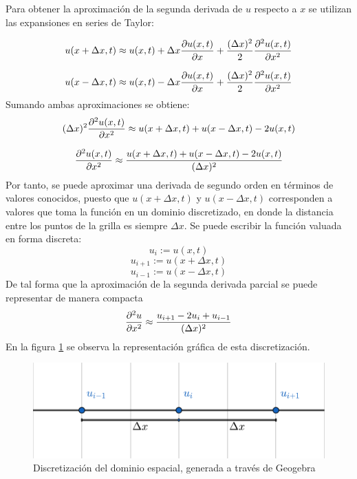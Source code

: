 \documentclass[12pt]{article}
\begin{document}
	Para obtener la aproximación de la segunda derivada de $u$ respecto a $x$ se utilizan las expansiones en series de Taylor:

	\begin{equation}
		u(x + \Delta x,t) \approx u(x,t) + \Delta x\pdv{u(x,t)}{x} + \frac{(\Delta x)^{2}}{2}\pdv{^{2}u(x,t)}{x^2} 
	\end{equation}

	\begin{equation}
		u(x - \Delta x,t) \approx u(x,t) - \Delta x\pdv{u(x,t)}{x}+\frac{(\Delta x)^{2}}{2}\pdv{^{2}u(x,t)}{x^2} 
	\end{equation}
	Sumando ambas aproximaciones se obtiene:
	\begin{equation}
		(\Delta x)^2 \pdv{^{2}u(x,t)}{x^2}\approx u(x + \Delta x,t) + u(x - \Delta x,t) - 2 u(x,t)
	\end{equation}

	\begin{equation}
		\pdv{^{2}u(x,t)}{x^2}\approx \frac{u(x + \Delta x,t) + u(x - \Delta x,t) - 2 u(x,t)}{(\Delta x)^2}
	\end{equation}
	Por tanto, se puede aproximar una derivada de segundo orden en términos de valores conocidos, puesto que $u(x + \Delta x,t)$ y $u(x - \Delta x,t)$ corresponden a valores que toma la función en un dominio discretizado, en donde la distancia entre los puntos de la grilla es siempre $\Delta x$. Se puede escribir la función valuada en forma discreta:
	\[u_{i} := u(x,t)\]
	\[u_{i+1} := u(x + \Delta x,t)\]
	\[u_{i-1} := u(x - \Delta x,t)\]
	De tal forma que la aproximación de la segunda derivada parcial se puede representar de manera compacta
	\begin{equation}
		\pdv{^{2}u}{x^2} \approx \frac{u_{i+1}-2u_{i}+u_{i-1}}{(\Delta x)^{2}}
		\label{eq:segunda-derivada-discreta}
	\end{equation}
	En la figura \ref{fig:discretizacion} se observa la representación gráfica de esta discretización.
	
	\begin{figure}[ht]
		\centering
		\includegraphics[scale=0.8]{images/grilla.pdf}
		\caption{Discretización del dominio espacial, generada a través de Geogebra}
		\label{fig:discretizacion}
	\end{figure}
	
\end{document}
